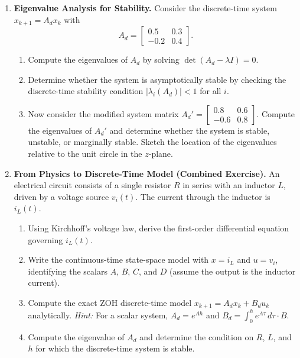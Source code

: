 \begin{enumerate}
\item \textbf{Eigenvalue Analysis for Stability.}
Consider the discrete-time system $x_{k+1} = A_d x_k$ with
\[
A_d = \begin{bmatrix} 0.5 & 0.3 \\ -0.2 & 0.4 \end{bmatrix}.
\]
\begin{enumerate}
	\item[(a)] Compute the eigenvalues of $A_d$ by solving $\det(A_d - \lambda I) = 0$.
	\item[(b)] Determine whether the system is asymptotically stable by checking the discrete-time stability condition $|\lambda_i(A_d)| < 1$ for all $i$.
	\item[(c)] Now consider the modified system matrix
	$A_d' = \begin{bmatrix} 0.8 & 0.6 \\ -0.6 & 0.8 \end{bmatrix}$.
	Compute the eigenvalues of $A_d'$ and determine whether the system is stable, unstable, or marginally stable. Sketch the location of the eigenvalues relative to the unit circle in the $z$-plane.
\end{enumerate}

\item \textbf{From Physics to Discrete-Time Model (Combined Exercise).}
An electrical circuit consists of a single resistor $R$ in series with an inductor $L$, driven by a voltage source $v_i(t)$. The current through the inductor is $i_L(t)$.
\begin{enumerate}
	\item[(a)] Using Kirchhoff's voltage law, derive the first-order differential equation governing $i_L(t)$.
	\item[(b)] Write the continuous-time state-space model with $x = i_L$ and $u = v_i$, identifying the scalars $A$, $B$, $C$, and $D$ (assume the output is the inductor current).
	\item[(c)] Compute the exact ZOH discrete-time model $x_{k+1} = A_d x_k + B_d u_k$ analytically. \textit{Hint:} For a scalar system, $A_d = e^{Ah}$ and $B_d = \int_0^h e^{A\tau}\,d\tau \cdot B$.
	\item[(d)] Compute the eigenvalue of $A_d$ and determine the condition on $R$, $L$, and $h$ for which the discrete-time system is stable.
\end{enumerate}

\end{enumerate}

